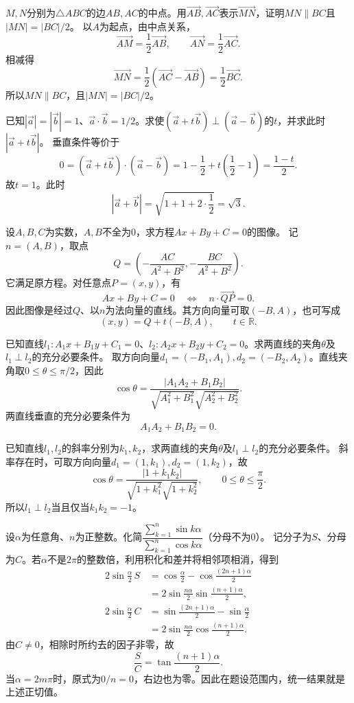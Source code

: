\(M,N\)分别为\(\triangle ABC\)的边\(AB,AC\)的中点。用\(\vec{AB},\vec{AC}\)表示\(\vec{MN}\)，证明\(MN\parallel BC\)且\(|MN|=|BC|/2\)。
\solutionanswer
以\(A\)为起点，由中点关系，
\[
\vec{AM}=\frac12\vec{AB},\qquad
\vec{AN}=\frac12\vec{AC}.
\]
相减得
\[
\vec{MN}=\frac12(\vec{AC}-\vec{AB})=\frac12\vec{BC}.
\]
所以\(MN\parallel BC\)，且\(|MN|=|BC|/2\)。


已知\(|\vec a|=|\vec b|=1\)、\(\vec a\cdot\vec b=1/2\)。求使\((\vec a+t\vec b)\perp(\vec a-\vec b)\)的\(t\)，并求此时\(|\vec a+t\vec b|\)。
\solutionanswer
垂直条件等价于
\[
0=(\vec a+t\vec b)\cdot(\vec a-\vec b)
=1-\frac12+t\left(\frac12-1\right)=\frac{1-t}2.
\]
故\(t=1\)。此时
\[
|\vec a+\vec b|=\sqrt{1+1+2\cdot\frac12}=\sqrt3.
\]


设\(A,B,C\)为实数，\(A,B\)不全为0，求方程\(Ax+By+C=0\)的图像。
\solutionanswer
记\(n=(A,B)\)，取点
\[
Q=\left(-\frac{AC}{A^2+B^2},-\frac{BC}{A^2+B^2}\right).
\]
它满足原方程。对任意点\(P=(x,y)\)，有
\[
Ax+By+C=0\quad\Longleftrightarrow\quad n\cdot\vec{QP}=0.
\]
因此图像是经过\(Q\)、以\(n\)为法向量的直线。其方向向量可取\((-B,A)\)，也可写成
\[
(x,y)=Q+t(-B,A),\qquad t\in\mathbb R.
\]


已知直线\(l_1:A_1x+B_1y+C_1=0\)、\(l_2:A_2x+B_2y+C_2=0\)。求两直线的夹角\(\theta\)及\(l_1\perp l_2\)的充分必要条件。
\solutionanswer
取方向向量\(d_1=(-B_1,A_1),d_2=(-B_2,A_2)\)。直线夹角取\(0\le\theta\le\pi/2\)，因此
\[
\cos\theta=
\frac{|A_1A_2+B_1B_2|}
{\sqrt{A_1^2+B_1^2}\sqrt{A_2^2+B_2^2}}.
\]
两直线垂直的充分必要条件为
\[
A_1A_2+B_1B_2=0.
\]


已知直线\(l_1,l_2\)的斜率分别为\(k_1,k_2\)，求两直线的夹角\(\theta\)及\(l_1\perp l_2\)的充分必要条件。
\solutionanswer
斜率存在时，可取方向向量\(d_1=(1,k_1),d_2=(1,k_2)\)，故
\[
\cos\theta=\frac{|1+k_1k_2|}{\sqrt{1+k_1^2}\sqrt{1+k_2^2}},
\qquad 0\le\theta\le\frac\pi2.
\]
所以\(l_1\perp l_2\)当且仅当\(k_1k_2=-1\)。


设\(\alpha\)为任意角、\(n\)为正整数。化简\(\dfrac{\sum_{k=1}^n\sin k\alpha}{\sum_{k=1}^n\cos k\alpha}\)（分母不为0）。
\solutionanswer
记分子为\(S\)、分母为\(C\)。若\(\alpha\)不是\(2\pi\)的整数倍，利用积化和差并将相邻项相消，得到
\[
\begin{aligned}
2\sin\frac\alpha2\,S
&=\cos\frac\alpha2-\cos\frac{(2n+1)\alpha}2\\
&=2\sin\frac{n\alpha}2\sin\frac{(n+1)\alpha}2,\\
2\sin\frac\alpha2\,C
&=\sin\frac{(2n+1)\alpha}2-\sin\frac\alpha2\\
&=2\sin\frac{n\alpha}2\cos\frac{(n+1)\alpha}2.
\end{aligned}
\]
由\(C\ne0\)，相除时所约去的因子非零，故
\[
\frac SC=\tan\frac{(n+1)\alpha}2.
\]
当\(\alpha=2m\pi\)时，原式为\(0/n=0\)，右边也为零。因此在题设范围内，统一结果就是上述正切值。


